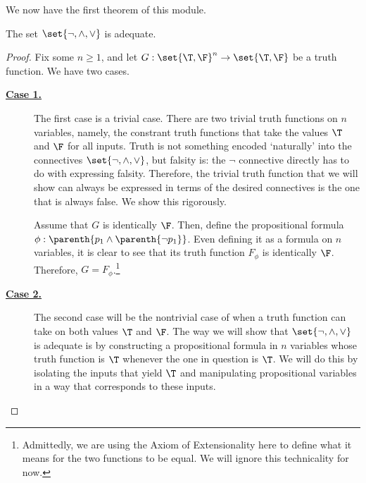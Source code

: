 We now have the first theorem of this module.

\begin{boxtheorem}\label{Ch1:Thm:DNFConnectivesAdequate}
    The set $\set{\neg, \land, \lor}$ is adequate.
\end{boxtheorem}
\begin{proof}
    Fix some $n \geq 1$, and let $G : \set{\T, \F}^n \to \set{\T, \F}$ be a truth function. We have two cases.

    \begin{description}
        \item[\textbf{\underline{Case 1.}}] The first case is a trivial case. There are two trivial truth functions on $n$ variables, namely, the constrant truth functions that take the values $\T$ and $\F$ for all inputs. Truth is not something encoded `naturally' into the connectives $\set{\neg, \land, \lor}$, but falsity is: the $\neg$ connective directly has to do with expressing falsity. Therefore, the trivial truth function that we will show can always be expressed in terms of the desired connectives is the one that is always false. We show this rigorously.
        
        Assume that $G$ is identically $\F$. Then, define the propositional formula $\phi : \parenth{p_1 \land \parenth{\neg p_1}}$. Even defining it as a formula on $n$ variables, it is clear to see that its truth function $F_{\phi}$ is identically $\F$. Therefore, $G = F_{\phi}$.\footnote{Admittedly, we are using the Axiom of Extensionality here to define what it means for the two functions to be equal. We will ignore this technicality for now.}
        
        \item[\textbf{\underline{Case 2.}}] The second case will be the nontrivial case of when a truth function can take on both values $\T$ and $\F$. The way we will show that $\set{\neg, \land, \lor}$ is adequate is by constructing a propositional formula in $n$ variables whose truth function is $\T$ whenever the one in question is $\T$. We will do this by isolating the inputs that yield $\T$ and manipulating propositional variables in a way that corresponds to these inputs.
        

\end{description}
\end{proof}
